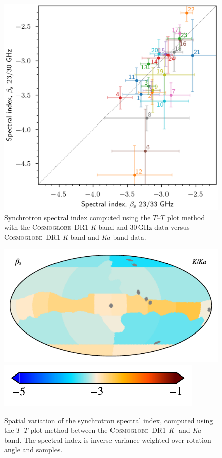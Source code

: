 \documentclass[twocolumn]{../../common/aa}
\newcommand{\Cosmoglobe}{\textsc{Cosmoglobe}}
\newcommand{\K}[0]{\textit K}
\newcommand{\Ka}[0]{\textit{Ka}}
\begin{document}
\begin{figure}
        \centering
        \includegraphics[width=\linewidth]{figures/xy_regions.png}
        \caption{
Synchrotron spectral index computed using the $T$--$T$ plot method with the \Cosmoglobe\ DR1 \K-band and 30\,GHz data versus \Cosmoglobe\ DR1 \K-band and \Ka-band data.}
        \label{fig:cos30_xyplot}
\end{figure}


\begin{figure}
	\centering
	\includegraphics{figures/TT_map_CG_KKa.pdf}\vspace{-0.25cm}\\
	\hspace{0.25cm}\includegraphics{figures/cbar_beta_wide.pdf}
	\caption{Spatial variation of the synchrotron spectral index, computed using the $T$--$T$ plot method between the \Cosmoglobe\ DR1 \K- and \Ka-band. The spectral index is inverse variance weighted over rotation angle and samples.}
        \label{fig:beta_map}
\end{figure}
\end{document}
